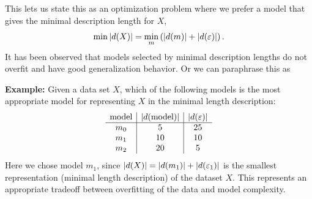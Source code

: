 \documentclass[a4paper,blends,pdf,colorBG,slideColor]{prosper}
\begin{document}

\vspace{.2in}
This lets us state this as an optimization problem where we prefer a model that gives the minimal description length for $X$,
\[
\min {|{d(X)}|} = \min_m \left ( {|{d(m)}|} + {|{d(\varepsilon)}|} \right).
\]
It has been observed that models selected by minimal description lengths do not overfit and have  good generalization behavior.
Or we can paraphrase this as

\es


{\bf Example:} Given a data set $X$, which of the following models is the most appropriate
model for representing $X$ in the minimal length description:
\[
\begin{array}{c|c|c}
\mbox{model} & {|{d(\mbox{model})}|} & {|{d(\varepsilon)}|} \\ \hline
m_0 &5 & 25\\
 m_1 & 10 & 10\\
 m_2 & 20 & 5
\end{array}
\]
Here we chose model $m_1$, since ${|{d(X)}|} = {|{d(m_1)}|} + {|{d(\varepsilon_1)}|}$ is 
the smallest representation (minimal length description) of the dataset $X$.  This represents an
appropriate tradeoff between overfitting of the data and model complexity. 
\es
\end{document}
